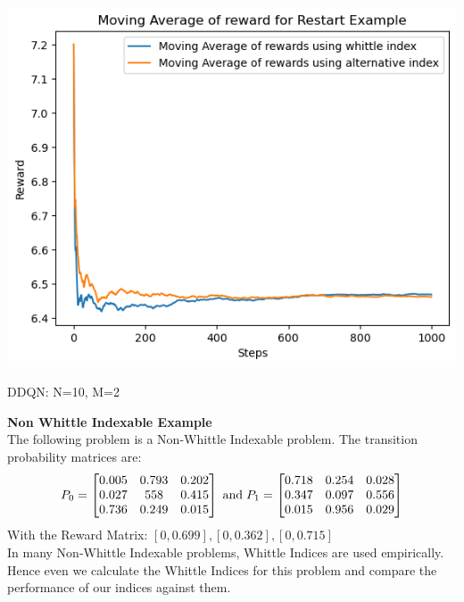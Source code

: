 \documentclass{slides}
\begin{document}
{\begin{center}
\includegraphics[scale=0.75]{restart_dqn.png}
\end{center}

\begin{center}
    
\begin{small}
\vspace{-10mm}
\hspace{5mm}DDQN: N=10, M=2\end{small}

 \end{center}
\newpage
\textbf{Non Whittle Indexable Example}\\
The following problem  is a Non-Whittle Indexable problem. The transition probability matrices are: 
 \begin{align*}
P_0=
\begin{bmatrix}
0.005 & 0.793 & 0.202\\
0.027 & 558 & 0.415 \\
0.736&0.249&0.015
\end{bmatrix}
\hspace{1mm} \text{and} \hspace{1mm}
P_1=
\begin{bmatrix}
0.718 & 0.254 & 0.028\\
0.347 & 0.097 & 0.556 \\
0.015&0.956&0.029
\end{bmatrix}
\end{align*}
With the Reward Matrix: $[0,0.699],[0,0.362],[0,0.715]$\\
In many Non-Whittle Indexable problems, Whittle Indices are used empirically. Hence
even we calculate the Whittle Indices for this problem and compare the performance of our indices against
them.

}
\end{document}
